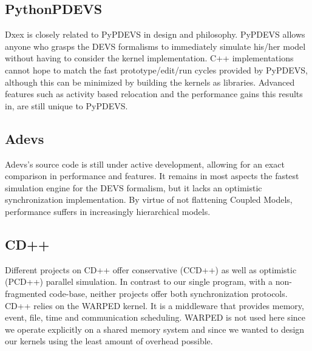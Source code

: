 \subsection{PythonPDEVS}
Dxex is closely related to PyPDEVS in design and philosophy. PyPDEVS allows anyone who grasps the DEVS formalisms to immediately simulate his/her model without having to consider the kernel implementation. C++ implementations cannot hope to match the fast prototype/edit/run cycles provided by PyPDEVS, although this can be minimized by building the kernels as libraries. %
Advanced features such as activity based relocation and the performance gains this results in, are still unique to PyPDEVS. \\
\subsection{Adevs}
Adevs's source code is still under active development, allowing for an exact comparison in performance and features. It remains in most aspects the fastest simulation engine for the DEVS formalism, but it lacks an optimistic synchronization implementation. %
By virtue of not flattening Coupled Models, performance suffers in increasingly hierarchical models.
\subsection{CD++}
Different projects on CD++ offer conservative (CCD++) as well as optimistic (PCD++) parallel simulation. In contrast to our single program, with a non-fragmented code-base, neither projects offer both synchronization protocols. CD++ relies on the WARPED kernel. It is a middleware that provides memory, event, file, time and communication scheduling. WARPED is not used here since we operate explicitly on a shared memory system and since we wanted to design our kernels using the least amount of overhead possible.
